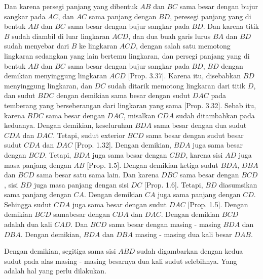 \documentclass[a4paper]{book}
\begin{document}
Dan karena persegi panjang yang dibentuk $AB$ dan $BC$ sama besar dengan
bujur sangkar pada $AC$, dan $AC$ sama panjang dengan $BD$,  peresegi
panjang yang di bentuk $AB$ dan $BC$ sama besar dengan bujur sangkar pada
$BD$.
Dan karena titik $B$ sudah diambil di luar lingkaran $ACD$, dan dua buah 
garis lurus $BA$ dan $BD$ sudah menyebar dari $B$ ke lingkaran $ACD$, 
dengan salah satu memotong lingkaran sedangkan yang lain bertemu 
lingkaran, dan persegi panjang yang di bentuk $AB$ dan $BC$ sama besar 
dengan bujur sangkar pada $BD$, $BD$ dengan demikian menyinggung lingkaran 
$ACD$ [Prop. 3.37]. Karena itu, disebabkan $BD$ menyinggung lingkaran, 
dan $DC$ sudah ditarik memotong lingkaran dari titik $D$, dan sudut $BDC$
dengan demikian sama besar dengan sudut $DAC$ pada temberang yang 
berseberangan dari lingkaran yang sama [Prop. 3.32]. Sebab itu, karena
$BDC$ sama besar dengan $DAC$, misalkan $CDA$ sudah ditambahkan pada 
keduanya. Dengan demikian, keseluruhan $BDA$ sama besar dengan dua sudut
$CDA$ dan $DAC$. Tetapi, sudut exterior $BCD$ sama besar dengan sudut 
besar sudut $CDA$ dan $DAC$ [Prop. 1.32]. Dengan demikian, $BDA$ juga
sama besar dengan $BCD$. Tetapi, $BDA$ juga sama besar dengan $CBD$, karena
sisi $AD$ juga masa panjang dengan $AB$ [Prop. 1.5].
Dengan demikian ketiga sudut $BDA$, $DBA$ dan 
$BCD$ sama besar satu sama lain. Dan karena $DBC$ sama besar dengan
$BCD$, sisi $BD$ juga masa panjang dengan sisi $DC$ [Prop. 1.6]. Tetapi,
$BD$ diasumsikan sama panjang dengan $CA$. Dengan demikian $CA$ juga
sama panjang dengan $CD$. Sehingga sudut $CDA$ juga sama besar dengan 
sudut $DAC$ [Prop. 1.5]. Dengan demikian $BCD$ samabesar dengan $CDA$ dan 
$DAC$. Dengan demikian $BCD$ adalah dua kali $CAD$. Dan $BCD$ sama besar 
dengan masing - masing  $BDA$ dan $DBA$. Dengan demikian, $BDA$ dan $DBA$
masing - masing dua kali besar $DAB$.

Dengan demikian, segitiga sama sisi $ABD$ sudah digambarkan dengan kedua
sudut pada alas masing - masing besarnya dua kali sudut selebihnya. Yang
adalah hal yang perlu dilakukan.

\end{document}

